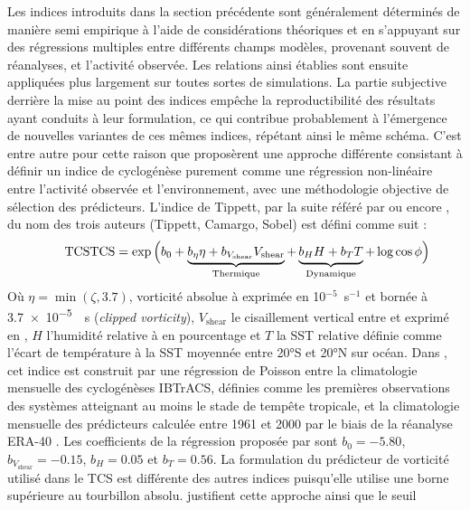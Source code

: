 \documentclass[../main.tex]{subfiles}
\begin{document}
Les indices introduits dans la section précédente sont généralement déterminés de manière semi empirique à l'aide de considérations théoriques et en s'appuyant
sur des régressions multiples entre différents champs modèles, provenant souvent de réanalyses, et l'activité observée. Les relations ainsi établies sont
ensuite appliquées plus largement sur toutes sortes de simulations. La partie subjective derrière la mise au point des indices empêche la reproductibilité des
résultats ayant conduits à leur formulation, ce qui contribue probablement à l'émergence de nouvelles variantes de ces mêmes indices, répétant ainsi le même
schéma. C'est entre autre pour cette raison que \textcite{tippett_poisson_2011} proposèrent une approche différente consistant à définir un indice de
cyclogénèse purement comme une régression non-linéaire entre l'activité observée et l'environnement, avec une méthodologie objective de sélection des
prédicteurs. L'indice de Tippett, par la suite référé par  ou encore , du nom des trois auteurs (Tippett, Camargo, Sobel) est
défini comme suit :
%
\begin{equation*}
    \tag*{TCS}
    \mathrm{TCS} = \exp \Big( b_0 + \underbrace{b_\eta \eta + b_{V_{\mathrm{shear}}} V_{\mathrm{shear}}}_{\mathrm{Thermique}} + \underbrace{\vphantom{b_\eta}b_H H + b_T
    T}_{\mathrm{Dynamique}} + \log \cos \phi \Big)
\end{equation*}
%
Où $\eta = \min (\zeta, \num{3.7})$, vorticité absolue à  exprimée en 10$^{-5}$~s$^{-1}$ et bornée à \SI{3.7e-5}{\per\second} (\textit{clipped
vorticity}), $V_{\mathrm{shear}}$ le cisaillement vertical entre  et  exprimé en \ms{}, $H$ l'humidité relative à  en pourcentage et
$T$ la SST relative définie comme l'écart de température à la SST moyennée entre \ang{20}S et \ang{20}N sur océan. Dans \textcite{tippett_poisson_2011}, cet
indice est construit par une régression de Poisson entre la climatologie mensuelle des cyclogénèses IBTrACS, définies comme les premières observations des
systèmes atteignant au moins le stade de tempête tropicale, et la climatologie mensuelle des prédicteurs calculée entre \num{1961} et \num{2000} par le biais de
la réanalyse ERA-40 \parencite{uppala_era40_2005}. Les coefficients de la régression proposée par \citeauthor{tippett_poisson_2011} sont $b_0 = \num{-5.80}$,
$b_{V_{\mathrm{shear}}} = \num{-0.15}$, $b_H = \num{0.05}$ et $b_T = \num{0.56}$. La formulation du prédicteur de vorticité utilisé dans le TCS est différente
des autres indices puisqu'elle utilise une borne supérieure au tourbillon absolu. \textcite{tippett_poisson_2011} justifient cette approche ainsi que le seuil
\end{document}
